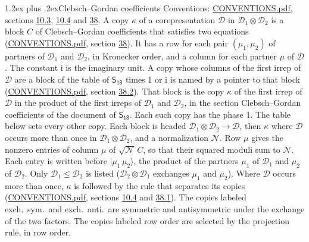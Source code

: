 \documentclass[10pt,a4paper]{article}
\makeatletter
\renewcommand\section{\@startsection{section}{1}{\z@}{-3ex plus -1ex minus -.2ex}%
  {1.2ex plus .2ex}{\normalfont\large\sffamily\bfseries\color{parttitle}}}
\numberwithin{equation}{section}
\newcommand{\grp}[1]{\mathsf{#1}}
\newcommand{\iunit}{\mathrm{i}}
\newcommand{\irrprod}{\otimes}
\newcommand{\mult}{\kappa}
\newcommand{\intx}{\mu}
\newcommand{\cgnorm}{\mathcal{N}}
\newcommand{\prodket}[2]{\lvert {#1}\,{#2}\rangle}
\makeatother
\begin{document}
\section{Clebsch--Gordan coefficients}\label{s:clebsch_gordan}
Conventions: \href{../../CONVENTIONS.pdf}{CONVENTIONS.pdf}, sections \href{../../../rotation/CONVENTIONS.pdf\#conv.10.3}{10.3}, \href{../../../rotation/CONVENTIONS.pdf\#conv.10.4}{10.4} and \href{../../CONVENTIONS.pdf\#conv.38}{38}.
\leavevmode\label{n:index.copy}\label{n:matrix.cg.stored}A copy $\mult$ of a corepresentation $\mathcal{D}$ in $\mathcal{D}_1\irrprod\mathcal{D}_2$ is a block $C$ of Clebsch--Gordan coefficients that satisfies two equations (\href{../../CONVENTIONS.pdf}{CONVENTIONS.pdf}, section \href{../../CONVENTIONS.pdf\#conv.38}{38}). \label{n:index.cg}It has a row for each pair $(\intx_1, \intx_2)$ of partners of $\mathcal{D}_1$ and $\mathcal{D}_2$, in Kronecker order, and a column for each partner $\intx$ of $\mathcal{D}$.
The constant $\iunit$ is the imaginary unit.
A copy whose columns of the first irrep of $\mathcal{D}$ are a block of the table of $\grp{S_{18}}$ times 1 or $\iunit$ is named by a pointer to that block (\href{../../CONVENTIONS.pdf}{CONVENTIONS.pdf}, section \href{../../CONVENTIONS.pdf\#conv.38.2}{38.2}). That block is the copy $\mult$ of the first irrep of $\mathcal{D}$ in the product of the first irreps of $\mathcal{D}_1$ and $\mathcal{D}_2$, in the section Clebsch--Gordan coefficients of the document of \href{../../../rotation/data/pdf/S18.pdf}{$\grp{S_{18}}$}. Each such copy has the phase 1. The table below sets every other copy.
Each block is headed $\mathcal{D}_1\irrprod\mathcal{D}_2\to\mathcal{D}$, then $\mult$ where $\mathcal{D}$ occurs more than once in $\mathcal{D}_1\irrprod\mathcal{D}_2$, and a normalization $\cgnorm$. Row $\intx$ gives the nonzero entries of column $\intx$ of $\sqrt{\cgnorm}\,C$, so that their squared moduli sum to $\cgnorm$. \label{n:vector.ket.product}Each entry is written before $\prodket{\intx_1}{\intx_2}$, the product of the partners $\intx_1$ of $\mathcal{D}_1$ and $\intx_2$ of $\mathcal{D}_2$. Only $\mathcal{D}_1 \le \mathcal{D}_2$ is listed ($\mathcal{D}_2\irrprod\mathcal{D}_1$ exchanges $\intx_1$ and $\intx_2$).
Where $\mathcal{D}$ occurs more than once, $\mult$ is followed by the rule that separates its copies (\href{../../CONVENTIONS.pdf}{CONVENTIONS.pdf}, sections \href{../../../rotation/CONVENTIONS.pdf\#conv.10.4}{10.4} and \href{../../CONVENTIONS.pdf\#conv.38.1}{38.1}). \label{n:abbreviation.exchange}The copies labeled exch.\ sym.\ and exch.\ anti.\ are symmetric and antisymmetric under the exchange of the two factors. The copies labeled row order are selected by the projection rule, in row order.
\end{document}
